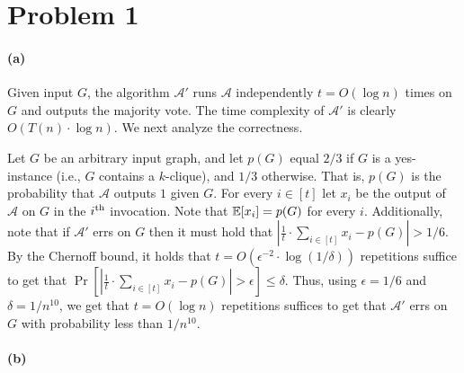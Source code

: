 
\section{Problem 1}

\paragraph{(a)}


Given input $G$, the algorithm $\mathcal{A}'$ runs $\mathcal{A}$ independently $t=O(\log n)$ times on $G$ and outputs the majority vote.
The time complexity of $\mathcal{A}'$  is clearly $O(T(n) \cdot \log n)$. We next analyze the correctness.


Let $G$ be an arbitrary input graph, and let $p(G)$ equal $2/3$ if $G$ is a yes-instance (i.e., $G$ contains a $k$-clique), and $1/3$ otherwise. That is, $p(G)$ is the probability that $\mathcal{A}$ outputs $1$ given $G$.
For every $i \in [t]$ let $x_i$ be the output of $\mathcal{A}$ on $G$ in the $i^{\text{th}}$ invocation. 
Note that $\operatorname{\mathbb{E}}[x_i] = p(G)$ for every $i$.  
Additionally, note that if $\mathcal{A}'$ errs on $G$ then it must hold that $\left| \frac{1}{t}\cdot \sum_{i\in[t]} x_i - p(G) \right| > 1/6$.
By the Chernoff bound, it holds that $t = O(\epsilon^{-2}\cdot \log(1/\delta))$ repetitions suffice to get that $\Pr\left[ \left|\frac{1}{t}\cdot\sum_{i\in[t]} x_i - p(G)\right| > \epsilon \right] \leq \delta$.
Thus, using $\epsilon = 1/6$ and $\delta = 1/n^{10}$, we get that $t = O(\log n)$ repetitions suffices to get that $\mathcal{A}'$ errs on $G$ with probability less than $1/n^{10}$.



\paragraph{(b)}

